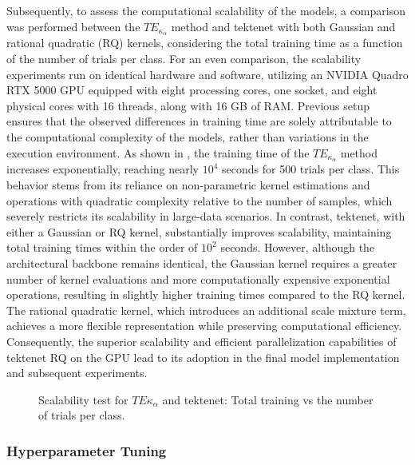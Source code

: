 Subsequently, to assess the computational scalability of the models, a comparison was performed between the $TE_{\kappa_\alpha}$ method and \gls{tektenet} with both Gaussian and rational quadratic (RQ) kernels, considering the total training time as a function of the number of trials per class. For an even comparison, the scalability experiments run on identical hardware and software, utilizing an NVIDIA Quadro RTX 5000 GPU equipped with eight processing cores, one socket, and eight physical cores with 16 threads, along with 16 GB of RAM. Previous setup ensures that the observed differences in training time are solely attributable to the computational complexity of the models, rather than variations in the execution environment. As shown in , the training time of the $TE_{\kappa_\alpha}$ method increases exponentially, reaching nearly $10^4$ seconds for 500 trials per class. This behavior stems from its reliance on non-parametric kernel estimations and operations with quadratic complexity relative to the number of samples, which severely restricts its scalability in large-data scenarios. In contrast, \gls{tektenet}, with either a Gaussian or RQ kernel, substantially improves scalability, maintaining total training times within the order of $10^2$ seconds. However, although the architectural backbone remains identical, the Gaussian kernel requires a greater number of kernel evaluations and more computationally expensive exponential operations, resulting in slightly higher training times compared to the RQ kernel. The rational quadratic kernel, which introduces an additional scale mixture term, achieves a more flexible representation while preserving computational efficiency. Consequently, the superior scalability and efficient parallelization capabilities of \gls{tektenet} RQ on the GPU lead to its adoption in the final model implementation and subsequent experiments.

\begin{figure}[htbp]
  \centering
  
  \caption{Scalability test for $TE\kappa_\alpha$ and \gls{tektenet}: Total training vs the number of trials per class.}\label{fig:runtime-scaling}
\end{figure}


\subsubsection{Hyperparameter Tuning}

